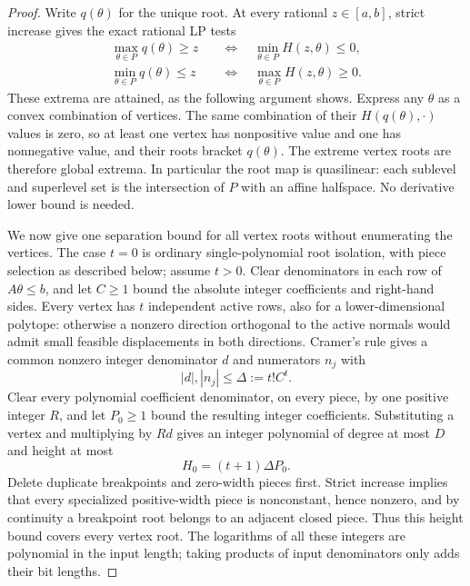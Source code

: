 \begin{proof}
Write $q(\theta)$ for the unique root.  At every rational $z\in[a,b]$,
strict increase gives the exact rational LP tests
\begin{align}
 \max_{\theta\in P}q(\theta)\ge z
 &\quad\Longleftrightarrow\quad
          \min_{\theta\in P}H(z,\theta)\le0,\label{eq:a-design-root-max}\\
 \min_{\theta\in P}q(\theta)\le z
 &\quad\Longleftrightarrow\quad
          \max_{\theta\in P}H(z,\theta)\ge0.\label{eq:a-design-root-min}
\end{align}
These extrema are attained, as the following argument shows. Express
any $\theta$ as a convex combination of vertices.  The same combination
of their $H(q(\theta),\cdot)$ values is zero, so at least one vertex has
nonpositive value and one has nonnegative value, and their roots bracket
$q(\theta)$.  The extreme vertex roots are therefore global extrema.
In particular the root map is quasilinear: each sublevel and superlevel
set is the intersection of $P$ with an affine halfspace.  No derivative
lower bound is needed.

We now give one separation bound for all vertex roots without
enumerating the vertices.  The case $t=0$ is ordinary single-polynomial
root isolation, with piece selection as described below; assume $t>0$.
Clear denominators in each row of $A\theta\le b$, and let $C\ge1$ bound
the absolute integer coefficients and right-hand sides.  Every vertex
has $t$ independent active rows, also for a lower-dimensional polytope:
otherwise a nonzero direction orthogonal to the active normals would
admit small feasible displacements in both directions.  Cramer's rule
gives a common nonzero integer denominator $d$ and numerators $n_j$ with
\[
 |d|,|n_j|\le\Delta:=t!C^t.
\]
Clear every polynomial coefficient denominator, on every piece, by one
positive integer $R$, and let $P_0\ge1$ bound the resulting integer
coefficients.  Substituting a vertex and multiplying by $Rd$ gives an
integer polynomial of degree at most $D$ and height at most
\[
 H_0=(t+1)\Delta P_0.
\]
Delete duplicate breakpoints and zero-width pieces first.  Strict
increase implies that every specialized positive-width piece is
nonconstant, hence nonzero, and by continuity a breakpoint root belongs
to an adjacent closed piece.  Thus this height bound covers every
vertex root.  The logarithms of all these integers are polynomial in
the input length; taking products of input denominators only adds
their bit lengths.


\end{proof}
